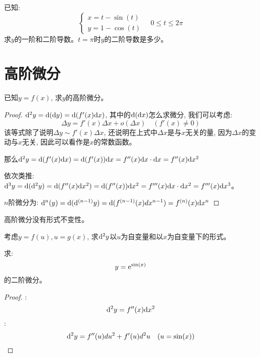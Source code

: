 \begin{example}[(旋轮线)]
    已知:
    \begin{equation*}
        \left\{
            \begin{aligned}
                x = t - \sin(t) \\
                y = 1 - \cos(t)
            \end{aligned}
        \right.
        \quad 0 \le t \le 2\pi
    \end{equation*}
    求$y$的一阶和二阶导数。$t= \pi$时$y$的二阶导数是多少。
\end{example}

\section{高阶微分}
\begin{problem}
    已知$y = f(x)$, 求$y$的高阶微分。
\end{problem}
\begin{proof}
    $\mathrm{d}^2 y = \mathrm{d}(\mathrm{d} y) = \mathrm{d}(f'(x)\mathrm{d} x)$, 其中的$\mathrm{d}(\mathrm{d} x)$怎么求微分, 我们可以考虑:
    \begin{equation*}
        \Delta y = f'(x)\Delta x +o(\Delta x) \quad (f'(x) \neq 0)
    \end{equation*}
    该等式除了说明$\Delta y \sim f'(x) \Delta x$, 还说明在上式中$\Delta x$是与$x$无关的量, 因为$\Delta x$的变动与$x$无关, 因此可以看作是$x$的常数函数。

    那么$\mathrm{d}^2 y = \mathrm{d}(f'(x)\mathrm{d} x) = \mathrm{d}(f'(x))\mathrm{d} x = f''(x)\mathrm{d} x \cdot \mathrm{d} x = f''(x)\mathrm{d} x^2$

    依次类推: $\mathrm{d}^3 y = \mathrm{d}(\mathrm{d}^2 y) = \mathrm{d}(f''(x)\mathrm{d} x^2) = \mathrm{d}(f''(x))\mathrm{d} x^2 = f'''(x)\mathrm{d} x \cdot \mathrm{d} x^2 = f'''(x)\mathrm{d} x^3$。
    
    $n$阶微分为: $\mathrm{d}^n(y) = \mathrm{d}(\mathrm{d}^{(n-1)}y) = \mathrm{d}(f^{(n-1)}(x)dx^{n-1}) = f^{(n)}(x)\mathrm{d} x^n$
\end{proof}

\begin{remark}
    高阶微分没有形式不变性。
\end{remark}
\begin{problem}
    考虑$y = f(u), u = g(x)$, 求$\mathrm{d}^2 y$以$u$为自变量和以$x$为自变量下的形式。
\end{problem}

\begin{example}
    求:
    \begin{equation*}
        y = \mathrm{e}^{\sin(x)}
    \end{equation*}
    的二阶微分。
\end{example}
\begin{proof}
    :
    \begin{equation*}
        \mathrm{d}^2 y = f''(x)\mathrm{d} x^2
    \end{equation*}
    :
    \begin{equation*}
        \mathrm{d}^2 y = f''(u)du^2+f'(u)d^2 u \quad (u = \sin(x))
    \end{equation*}
\end{proof}


